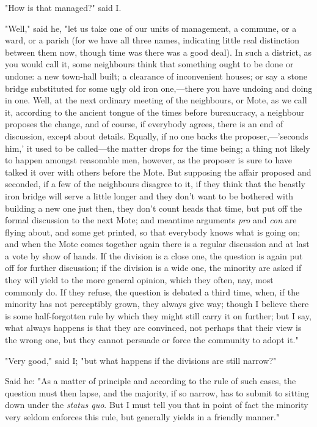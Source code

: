 "How is that managed?" said I.

"Well," said he, "let us take one of our units of management, a commune,
or a ward, or a parish (for we have all three names, indicating little
real distinction between them now, though time was there was a good
deal). In such a district, as you would call it, some neighbours think
that something ought to be done or undone: a new town-hall built; a
clearance of inconvenient houses; or say a stone bridge substituted for
some ugly old iron one,---there you have undoing and doing in one. Well,
at the next ordinary meeting of the neighbours, or Mote, as we call it,
according to the ancient tongue of the times before bureaucracy, a
neighbour proposes the change, and of course, if everybody agrees, there
is an end of discussion, except about details. Equally, if no one backs
the proposer,---'seconds him,' it used to be called---the matter drops
for the time being; a thing not likely to happen amongst reasonable men,
however, as the proposer is sure to have talked it over with others
before the Mote. But supposing the affair proposed and seconded, if a
few of the neighbours disagree to it, if they think that the beastly
iron bridge will serve a little longer and they don't want to be
bothered with building a new one just then, they don't count heads that
time, but put off the formal discussion to the next Mote; and meantime
arguments \emph{pro} and \emph{con} are flying about, and some get
printed, so that everybody knows what is going on; and when the Mote
comes together again there is a regular discussion and at last a vote by
show of hands. If the division is a close one, the question is again put
off for further discussion; if the division is a wide one, the minority
are asked if they will yield to the more general opinion, which they
often, nay, most commonly do. If they refuse, the question is debated a
third time, when, if the minority has not perceptibly grown, they always
give way; though I believe there is some half-forgotten rule by which
they might still carry it on further; but I say, what always happens is
that they are convinced, not perhaps that their view is the wrong one,
but they cannot persuade or force the community to adopt it."

"Very good," said I; "but what happens if the divisions are still
narrow?"

Said he: "As a matter of principle and according to the rule of such
cases, the question must then lapse, and the majority, if so narrow, has
to submit to sitting down under the \emph{status quo}. But I must tell
you that in point of fact the minority very seldom enforces this rule,
but generally yields in a friendly manner."

